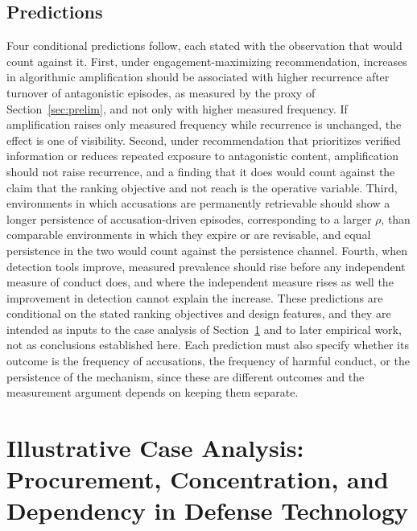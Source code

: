 \documentclass[12pt]{article}
\theoremstyle{remark}
\begin{document}
\subsection{Predictions}

Four conditional predictions follow, each stated with the observation that would count against it. First, under engagement-maximizing recommendation, increases in algorithmic amplification should be associated with higher recurrence after turnover of antagonistic episodes, as measured by the proxy of Section~\ref{sec:prelim}, and not only with higher measured frequency. If amplification raises only measured frequency while recurrence is unchanged, the effect is one of visibility. Second, under recommendation that prioritizes verified information or reduces repeated exposure to antagonistic content, amplification should not raise recurrence, and a finding that it does would count against the claim that the ranking objective and not reach is the operative variable. Third, environments in which accusations are permanently retrievable should show a longer persistence of accusation-driven episodes, corresponding to a larger $\rho$, than comparable environments in which they expire or are revisable, and equal persistence in the two would count against the persistence channel. Fourth, when detection tools improve, measured prevalence should rise before any independent measure of conduct does, and where the independent measure rises as well the improvement in detection cannot explain the increase. These predictions are conditional on the stated ranking objectives and design features, and they are intended as inputs to the case analysis of Section~\ref{sec:case} and to later empirical work, not as conclusions established here. Each prediction must also specify whether its outcome is the frequency of accusations, the frequency of harmful conduct, or the persistence of the mechanism, since these are different outcomes and the measurement argument depends on keeping them separate.

\section{Illustrative Case Analysis: Procurement, Concentration, and Dependency in Defense Technology}
\label{sec:case}
\end{document}
